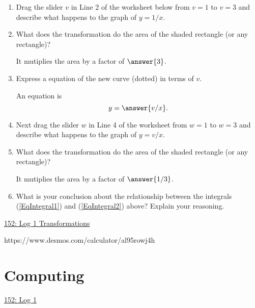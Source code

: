 \documentclass{ximera}
\begin{document}
\begin{exploration}  \label{Ex:LdkDERer4}

\begin{enumerate}
\item Drag the slider $v$ in Line 2 of the worksheet below from $v=1$ to $v=3$ and describe what happens to the graph of $y=1/x$.

\begin{freeResponse}
\end{freeResponse}

\item What does the transformation do the area of the shaded rectangle (or any rectangle)?

It mutiplies the area by a factor of $\answer{3}$.

\item Express a equation of the new curve (dotted) in terms of $v$.

An equation is
\[
 y = \answer{v/x}.
\]


\item Next drag the slider $w$ in Line 4 of the worksheet from $w=1$ to $w=3$ and describe what happens to the graph of $y=v/x$.

\begin{freeResponse}
\end{freeResponse}

\item What does the transformation do the area of the shaded rectangle (or any rectangle)?

It mutiplies the area by a factor of $\answer{1/3}$.

\item What is your conclusion about the relationship between the integrals (\ref{EqIntegral1}) and (\ref{EqIntegral2}) above? Explain your reasoning. 

\begin{freeResponse}
\end{freeResponse}



\end{enumerate}

\begin{onlineOnly}
    \begin{center}
\end{center}
\end{onlineOnly}

\href{https://www.desmos.com/calculator/al95rowj4h}{152: Log 1 Transformations}


https://www.desmos.com/calculator/al95rowj4h


\end{exploration}



\section{Computing}

\begin{onlineOnly}
    \begin{center}
\end{center}
\end{onlineOnly}

\href{https://www.desmos.com/calculator/rbcbxdrvcp}{152: Log 1}
\end{document}
